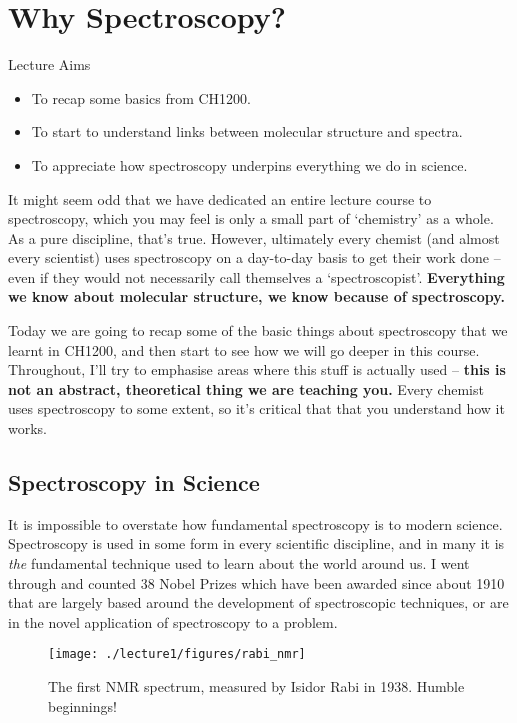 \chapter{Why Spectroscopy?}

\begin{aims}{Lecture Aims}{
\begin{itemize}
\item To recap some basics from CH1200.
\item To start to understand links between molecular structure and spectra.
\item To appreciate how spectroscopy underpins everything we do in science.
\end{itemize}}
\end{aims}

It might seem odd that we have dedicated an entire lecture course to spectroscopy, which you may feel is only a small part of `chemistry' as a whole. As a pure discipline, that's true. However, ultimately every chemist (and almost every scientist) uses spectroscopy on a day-to-day basis to get their work done -- even if they would not necessarily call themselves a `spectroscopist'. \textbf{Everything we know about molecular structure, we know because of spectroscopy.}

Today we are going to recap some of the basic things about spectroscopy that we learnt in CH1200, and then start to see how we will go deeper in this course. Throughout, I'll try to emphasise areas where this stuff is actually used -- \textbf{this is not an abstract, theoretical thing we are teaching you.} Every chemist uses spectroscopy to some extent, so it's critical that that you understand how it works.

\section{Spectroscopy in Science}
It is impossible to overstate how fundamental spectroscopy is to modern science. Spectroscopy is used in some form in every scientific discipline, and in many it is \textit{the} fundamental technique used to learn about the world around us. I went through and counted 38 Nobel Prizes which have been awarded since about 1910 that are largely based around the development of spectroscopic techniques, or are in the novel application of spectroscopy to a problem. 

\begin{figure}
\centering
\texttt{[image: ./lecture1/figures/rabi\_nmr]}
\caption{The first NMR spectrum, measured by Isidor Rabi in 1938. Humble beginnings!}
\end{figure}

